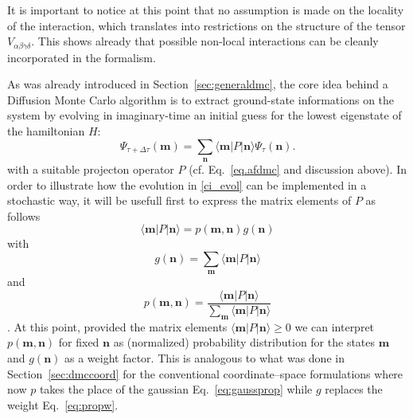 It is important to notice at this point that no assumption is made on the locality of the 
interaction, which translates into restrictions on the structure of the tensor $V_{\alpha\beta\gamma\delta}$. This 
shows already that possible non-local interactions can be cleanly incorporated in the formalism.

As was already introduced in Section~\ref{sec:generaldmc}, the core idea behind a Diffusion Monte Carlo algorithm is
to extract ground-state informations on the system by evolving in imaginary-time an initial guess for the lowest
eigenstate of the hamiltonian $H$: 
\begin{equation}
\label{ci_evol}
\Psi_{\tau + \Delta\tau} (\mathbf{m}) = \sum_{\mathbf{n}} \langle \mathbf{m} \lvert P \rvert \mathbf{n} \rangle \Psi_{\tau} (\mathbf{n}) .
\end{equation}
with a suitable projecton operator $P$ (cf. Eq.~\eqref{eq.afdmc} and discussion above). 
In order to illustrate how the evolution in \eqref{ci_evol} can be implemented in a stochastic way, it will be usefull
first to express the matrix elements of $P$ as follows
\begin{equation}
\langle \mathbf{m} \lvert P \rvert \mathbf{n} \rangle = p(\mathbf{m},\mathbf{n}) g(\mathbf{n})
\end{equation}
with
\begin{equation}
\label{eq:CIMC_branching_factor}
g(\mathbf{n}) = \sum_{\mathbf{m}} \langle \mathbf{m} \lvert P \rvert \mathbf{n} \rangle 
\end{equation}
and
\begin{equation}
\label{eq:CIMC_prob}
p(\mathbf{m},\mathbf{n}) = \frac{\langle \mathbf{m} \lvert P \rvert \mathbf{n} \rangle}{\sum_{\mathbf{m}} \langle \mathbf{m} \lvert P \rvert \mathbf{n} \rangle }
\end{equation}.
At this point, provided the matrix elements $\langle \mathbf{m} \lvert P \rvert \mathbf{n} \rangle \geq 0$ we can interpret 
$p(\mathbf{m},\mathbf{n})$ for fixed $\mathbf{n}$ as (normalized) probability distribution for the states $\mathbf{m}$ and 
$g(\mathbf{n})$ as a weight factor. This is analogous to what was done in Section~\ref{sec:dmccoord} for the conventional coordinate--space formulations  
where now $p$ takes the place of the gaussian Eq.~\eqref{eq:gaussprop} while $g$ replaces the weight Eq.~\eqref{eq:propw}.

